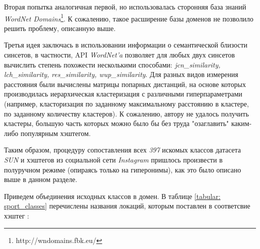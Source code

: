 \indent
\indent
Вторая попытка аналогичная первой, но использовалась сторонняя база знаний
\textit{WordNet Domains}\footnote{http://wndomains.fbk.eu/}. К сожалению, такое
расширение базы доменов не позволило решить проблему, описанную выше.


\indent
\indent
Третья идея заключась в использовании информации о семантической близости 
синсетов, в частности, API \textit{WordNet'a} позволяет для любых двух синсетов
вычислить степень похожести несколькими способами:
\textit{jcn\_similarity, lch\_similarity, res\_similarity, wup\_similarity}.
Для разных видов измерения расстояния были вычислены матрицы попарных дистанций,
на основе которых производилась иерархическая кластеризация с различными
гиперпараметрами
 (например, класторизация по заданному максимальному расстоянию в кластере, 
по заданному количеству кластеров). К сожалению, автору не удалось получить кластеры,
большую часть которых можно было бы без труда "озаглавить" 
каким-либо популярным хэштегом.


\indent
\indent
Таким образом, процедуру сопоставления всех 
\textit{397} искомых классов датасета \textit{SUN} и хэштегов из социальной сети \textit{Instagram}
пришлось произвести в полуручном режиме (опираясь только на гиперонимы),
как это было описано выше в данном разделе.


\indent
\indent
Приведем объединения исходных классов в домен. В таблице \ref{tabular: sport_classes} 
перечислены названия локаций, которым поставлен в соответсвие хэштег :


